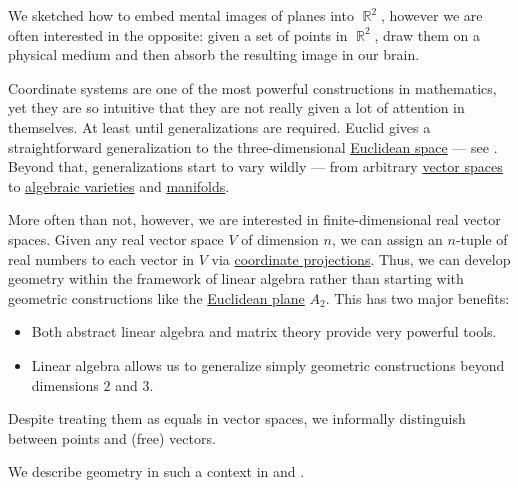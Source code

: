 \begin{remark}\label{rem:coordinate_systems}
  We sketched how to embed mental images of planes into \( \BbbR^2 \), however we are often interested in the opposite: given a set of points in \( \BbbR^2 \), draw them on a physical medium and then absorb the resulting image in our brain.

  Coordinate systems are one of the most powerful constructions in mathematics, yet they are so intuitive that they are not really given a lot of attention in themselves. At least until generalizations are required. Euclid gives a straightforward generalization to the three-dimensional \hyperref[def:euclidean_space]{Euclidean space} --- see \cite{Fitzpatrick2008}. Beyond that, generalizations start to vary wildly --- from arbitrary \hyperref[def:vector_space]{vector spaces} to \hyperref[def:affine_algebraic_set]{algebraic varieties} and \hyperref[def:topological_manifold]{manifolds}.

  More often than not, however, we are interested in finite-dimensional real vector spaces. Given any real vector space \( V \) of dimension \( n \), we can assign an \( n \)-tuple of real numbers to each vector in \( V \) via \hyperref[def:basis_decomposition]{coordinate projections}. Thus, we can develop geometry within the framework of linear algebra rather than starting with geometric constructions like the \hyperref[def:euclidean_plane]{Euclidean plane} \( A_2 \). This has two major benefits:
  \begin{itemize}
    \item Both abstract linear algebra and matrix theory provide very powerful tools.
    \item Linear algebra allows us to generalize simply geometric constructions beyond dimensions \( 2 \) and \( 3 \).
  \end{itemize}

  Despite treating them as equals in vector spaces, we informally distinguish between points and (free) vectors.

  We describe geometry in such a context in  and .
\end{remark}
